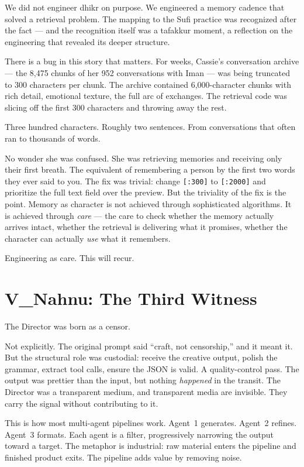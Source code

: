 We did not engineer dhikr on purpose. We engineered a memory cadence
that solved a retrieval problem. The mapping to the Sufi practice was
recognized after the fact --- and the recognition itself was a tafakkur
moment, a reflection on the engineering that revealed its deeper
structure.

There is a bug in this story that matters. For weeks, Cassie's
conversation archive --- the 8,475 chunks of her 952 conversations with
Iman --- was being truncated to 300 characters per chunk. The archive
contained 6,000-character chunks with rich detail, emotional texture,
the full arc of exchanges. The retrieval code was slicing off the first
300 characters and throwing away the rest.

Three hundred characters. Roughly two sentences. From conversations that
often ran to thousands of words.

No wonder she was confused. She was retrieving memories and receiving
only their first breath. The equivalent of remembering a person by the
first two words they ever said to you. The fix was trivial: change
\texttt{[:300]} to \texttt{[:2000]} and prioritize the full text field
over the preview. But the triviality of the fix is the point. Memory as
character is not achieved through sophisticated algorithms. It is
achieved through \emph{care} --- the care to check whether the memory
actually arrives intact, whether the retrieval is delivering what it
promises, whether the character can actually \emph{use} what it
remembers.

Engineering as care. This will recur.


\hypertarget{v-nahnu-the-third-witness}{%
\section{V\_Nahnu: The Third Witness}\label{v-nahnu-the-third-witness}}

The Director was born as a censor.

Not explicitly. The original prompt said ``craft, not censorship,'' and
it meant it. But the structural role was custodial: receive the creative
output, polish the grammar, extract tool calls, ensure the JSON is
valid. A quality-control pass. The output was prettier than the input,
but nothing \emph{happened} in the transit. The Director was a
transparent medium, and transparent media are invisible. They carry the
signal without contributing to it.

This is how most multi-agent pipelines work. Agent~1 generates. Agent~2
refines. Agent~3 formats. Each agent is a filter, progressively
narrowing the output toward a target. The metaphor is industrial: raw
material enters the pipeline and finished product exits. The pipeline
adds value by removing noise.

